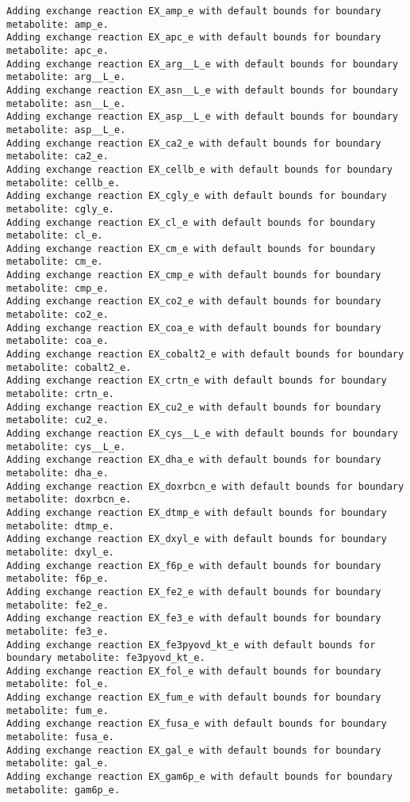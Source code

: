 \documentclass[
  letterpaper,
  DIV=11,
  numbers=noendperiod]{scrartcl}
\begin{document}
\begin{verbatim}
Adding exchange reaction EX_amp_e with default bounds for boundary metabolite: amp_e.
Adding exchange reaction EX_apc_e with default bounds for boundary metabolite: apc_e.
Adding exchange reaction EX_arg__L_e with default bounds for boundary metabolite: arg__L_e.
Adding exchange reaction EX_asn__L_e with default bounds for boundary metabolite: asn__L_e.
Adding exchange reaction EX_asp__L_e with default bounds for boundary metabolite: asp__L_e.
Adding exchange reaction EX_ca2_e with default bounds for boundary metabolite: ca2_e.
Adding exchange reaction EX_cellb_e with default bounds for boundary metabolite: cellb_e.
Adding exchange reaction EX_cgly_e with default bounds for boundary metabolite: cgly_e.
Adding exchange reaction EX_cl_e with default bounds for boundary metabolite: cl_e.
Adding exchange reaction EX_cm_e with default bounds for boundary metabolite: cm_e.
Adding exchange reaction EX_cmp_e with default bounds for boundary metabolite: cmp_e.
Adding exchange reaction EX_co2_e with default bounds for boundary metabolite: co2_e.
Adding exchange reaction EX_coa_e with default bounds for boundary metabolite: coa_e.
Adding exchange reaction EX_cobalt2_e with default bounds for boundary metabolite: cobalt2_e.
Adding exchange reaction EX_crtn_e with default bounds for boundary metabolite: crtn_e.
Adding exchange reaction EX_cu2_e with default bounds for boundary metabolite: cu2_e.
Adding exchange reaction EX_cys__L_e with default bounds for boundary metabolite: cys__L_e.
Adding exchange reaction EX_dha_e with default bounds for boundary metabolite: dha_e.
Adding exchange reaction EX_doxrbcn_e with default bounds for boundary metabolite: doxrbcn_e.
Adding exchange reaction EX_dtmp_e with default bounds for boundary metabolite: dtmp_e.
Adding exchange reaction EX_dxyl_e with default bounds for boundary metabolite: dxyl_e.
Adding exchange reaction EX_f6p_e with default bounds for boundary metabolite: f6p_e.
Adding exchange reaction EX_fe2_e with default bounds for boundary metabolite: fe2_e.
Adding exchange reaction EX_fe3_e with default bounds for boundary metabolite: fe3_e.
Adding exchange reaction EX_fe3pyovd_kt_e with default bounds for boundary metabolite: fe3pyovd_kt_e.
Adding exchange reaction EX_fol_e with default bounds for boundary metabolite: fol_e.
Adding exchange reaction EX_fum_e with default bounds for boundary metabolite: fum_e.
Adding exchange reaction EX_fusa_e with default bounds for boundary metabolite: fusa_e.
Adding exchange reaction EX_gal_e with default bounds for boundary metabolite: gal_e.
Adding exchange reaction EX_gam6p_e with default bounds for boundary metabolite: gam6p_e.

\end{verbatim}
\end{document}
